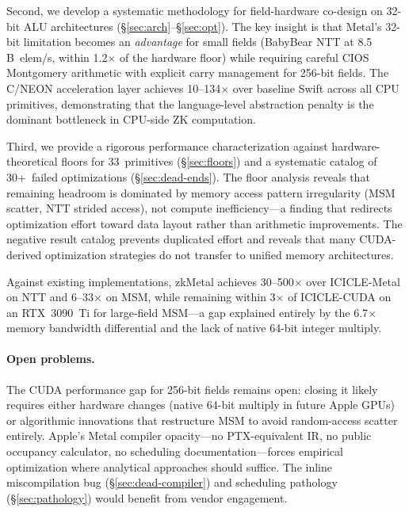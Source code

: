 Second, we develop a systematic methodology for field-hardware co-design on 32-bit ALU architectures (\S\ref{sec:arch}--\S\ref{sec:opt}).
The key insight is that Metal's 32-bit limitation becomes an \emph{advantage} for small fields (BabyBear NTT at 8.5\,B~elem/s, within 1.2$\times$ of the hardware floor) while requiring careful CIOS Montgomery arithmetic with explicit carry management for 256-bit fields.
The C/NEON acceleration layer achieves 10--134$\times$ over baseline Swift across all CPU primitives, demonstrating that the language-level abstraction penalty is the dominant bottleneck in CPU-side ZK computation.

Third, we provide a rigorous performance characterization against hardware-theoretical floors for 33~primitives (\S\ref{sec:floors}) and a systematic catalog of 30+~failed optimizations (\S\ref{sec:dead-ends}).
The floor analysis reveals that remaining headroom is dominated by memory access pattern irregularity (MSM scatter, NTT strided access), not compute inefficiency---a finding that redirects optimization effort toward data layout rather than arithmetic improvements.
The negative result catalog prevents duplicated effort and reveals that many CUDA-derived optimization strategies do not transfer to unified memory architectures.

Against existing implementations, zkMetal achieves 30--500$\times$ over ICICLE-Metal on NTT and 6--33$\times$ on MSM, while remaining within 3$\times$ of ICICLE-CUDA on an RTX~3090~Ti for large-field MSM---a gap explained entirely by the 6.7$\times$ memory bandwidth differential and the lack of native 64-bit integer multiply.

\paragraph{Open problems.}
The CUDA performance gap for 256-bit fields remains open: closing it likely requires either hardware changes (native 64-bit multiply in future Apple GPUs) or algorithmic innovations that restructure MSM to avoid random-access scatter entirely.
Apple's Metal compiler opacity---no PTX-equivalent IR, no public occupancy calculator, no scheduling documentation---forces empirical optimization where analytical approaches should suffice.
The inline miscompilation bug (\S\ref{sec:dead-compiler}) and scheduling pathology (\S\ref{sec:pathology}) would benefit from vendor engagement.


